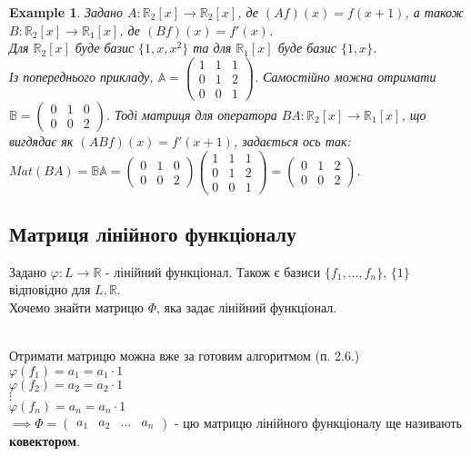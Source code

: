 \documentclass[a4paper, 10pt]{article}
\theoremstyle{theoremdd}
\newtheorem{example}[theorem]{Example}
\begin{document}
	\begin{example}
	Задано $A \colon \mathbb{R}_2[x] \to \mathbb{R}_2[x]$, де $(Af)(x) = f(x+1)$, а також $B \colon \mathbb{R}_2[x] \to \mathbb{R}_1[x]$, де $(Bf)(x) = f'(x)$.\\
	Для $\mathbb{R}_2[x]$ буде базис $\{1,x,x^2\}$ та для $\mathbb{R}_1[x]$ буде базис $\{1,x\}$.\\
	Із попереднього прикладу, $\mathbb{A} = \begin{pmatrix}
	1 & 1 & 1 \\
	0 & 1 & 2 \\
	0 & 0 & 1
	\end{pmatrix}$. Самостійно можна отримати $\mathbb{B} = \begin{pmatrix}
	0 & 1 & 0 \\
	0 & 0 & 2
	\end{pmatrix}$. Тоді матриця для оператора $BA: \mathbb{R}_2[x] \to \mathbb{R}_1[x]$, що вигдядає як $(ABf)(x) = f'(x+1)$, задається ось так:\\
	$Mat (BA) = \mathbb{B} \mathbb{A} =  \begin{pmatrix}
	0 & 1 & 0 \\
	0 & 0 & 2
	\end{pmatrix} \begin{pmatrix}
	1 & 1 & 1 \\
	0 & 1 & 2 \\
	0 & 0 & 1
	\end{pmatrix} = \begin{pmatrix}
	0 & 1 & 2 \\
	0 & 0 & 2
	\end{pmatrix}$.
	\end{example}	
	
	\subsection{Матриця лінійного функціоналу}
	Задано $\varphi \colon L \to \mathbb{R}$ - лінійний функціонал. Також є базиси $\{f_1,\dots,f_n\}$, $\{1\}$ відповідно для $L,\mathbb{R}$.\\
	Хочемо знайти матрицю $\Phi$, яка задає лінійний функціонал.\\
	\\
Отримати матрицю можна вже за готовим алгоритмом (п. 2.6.)\\
	$\varphi(f_1) = a_1 = a_1 \cdot 1$\\
	$\varphi(f_2) = a_2 = a_2 \cdot 1$\\
	$\vdots$\\
	$\varphi(f_n) = a_n = a_n \cdot 1$\\
	$\implies \Phi = \begin{pmatrix} a_1 & a_2 & \dots & a_n \end{pmatrix}$ - цю матрицю лінійного функціоналу ще називають \textbf{ковектором}.
\end{document}
